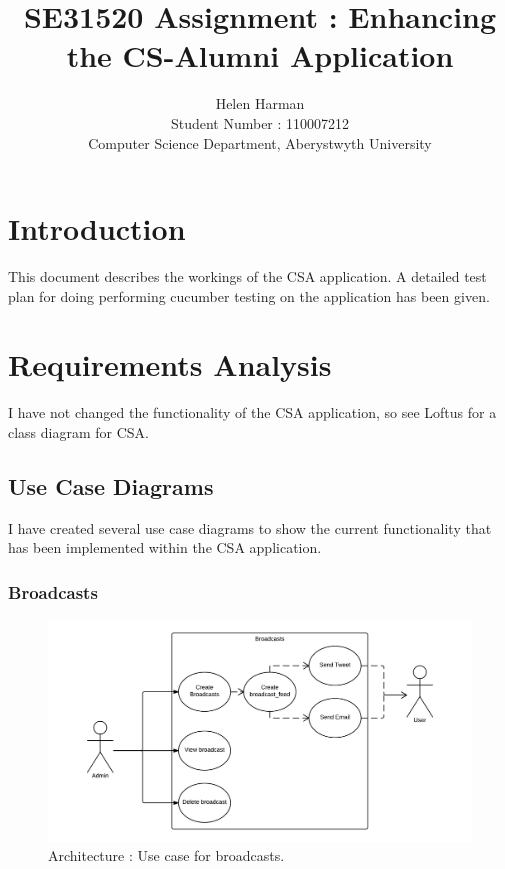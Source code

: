 \documentclass[10pt,a4paper,titlepage]{article}
\author{Helen Harman \\ Student Number : 110007212 \\ Computer Science Department, Aberystwyth University}
\title{SE31520 Assignment : Enhancing the CS-Alumni Application}
\begin{document}
\maketitle 

\tableofcontents

\pagebreak 
\section{Introduction}
This document describes the workings of the CSA application. A detailed test plan for doing performing cucumber testing on the application has been given.
\section{Requirements Analysis}
I have not changed the functionality of the CSA application, so see Loftus \cite[5]{design} for a class diagram for CSA.

\subsection{Use Case Diagrams}
I have created several use case diagrams to show the current functionality that has been implemented within the CSA application. 
\subsubsection{Broadcasts}
\begin{figure}[H]
\begin{center}
\includegraphics[scale=0.3]{include/broadcasts_Use_Case.png}  
\caption{Architecture : Use case for broadcasts. }
\label{fig:broadcastUseCase}
\end{center}
\end{figure}
\end{document}
